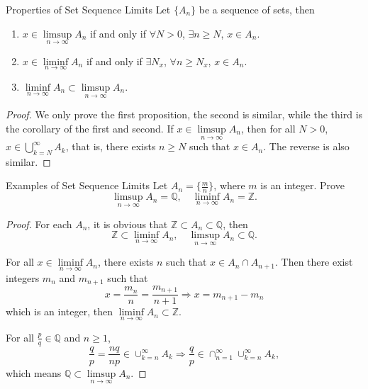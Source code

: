 \begin{proposition}{Properties of Set Sequence Limits}{}
  Let $\{A_n\}$ be a sequence of sets, then
  \begin{enumerate}
  \item $x \in \limsup \limits_{n \rightarrow \infty} A_n$ if and only if
    $\forall N > 0$, $\exists n \geq N$, $x \in A_n$.
  \item $x \in \liminf \limits_{n \rightarrow \infty} A_n$ if and only if
    $\exists N_x$, $\forall n \geq N_x$, $x \in A_n$.
  \item $\liminf \limits_{n \rightarrow \infty} A_n \subset \limsup \limits_{n
      \rightarrow \infty} A_n$.
  \end{enumerate}
\end{proposition}

\begin{proof}
  We only prove the first proposition, the second is similar,
  while the third is the corollary of the first and second.
  If $x \in \limsup\limits_{n \rightarrow \infty}A_n$,
  then for all $N > 0$, $x \in \bigcup \limits_{k = N}^{\infty}A_k$,
  that is, there exists $n \geq N$ such that $x \in A_n$.
  The reverse is also similar.
\end{proof}

\begin{example}{Examples of Set Sequence Limits}{}
  Let $A_n = \{\frac{m}{n}\}$, where $m$ is an integer. Prove
  \begin{equation}
    \limsup \limits_{n \rightarrow \infty} A_n = \mathbb{Q}, \quad
    \liminf \limits_{n \rightarrow \infty} A_n = \mathbb{Z}.
  \end{equation}
\end{example}

\begin{proof}
  For each $A_n$, it is obvious that $\mathbb{Z} \subset A_n \subset
  \mathbb{Q}$, then
  \begin{equation}
    \mathbb{Z} \subset \liminf \limits_{n \rightarrow \infty} A_n, \quad
    \limsup \limits_{n \rightarrow \infty} A_n \subset \mathbb{Q}.
  \end{equation}

  For all $x \in \liminf \limits_{n \rightarrow \infty} A_n$, there exists $n$
  such that $x \in A_n \cap A_{n+1}$.
  Then there exist integers $m_n$ and $m_{n+1}$ such that
  \begin{equation}
    x = \frac{m_n}{n} = \frac{m_{n+1}}{n+1} \Rightarrow x = m_{n+1} - m_n
  \end{equation}
  which is an integer, then $\liminf \limits_{n \rightarrow \infty} A_n \subset \mathbb{Z}$.

  For all $\frac{p}{q} \in \mathbb{Q}$ and $n \geq 1$,
  \begin{equation}
    \frac{q}{p} = \frac{nq}{np} \in \cup _{k = n}^{\infty} A_k
    \Rightarrow
    \frac{q}{p} \in \cap _{n = 1}^{\infty} \cup _{k = n}^{\infty}A_k,
  \end{equation}
  which means $\mathbb{Q} \subset \limsup \limits_{n \rightarrow \infty}A_n$.
\end{proof}



